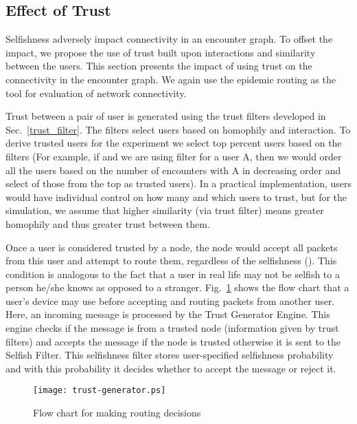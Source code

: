 \documentclass[10pt,conference]{IEEEtran}
\begin{document}
\subsection{Effect of Trust}


Selfishness adversely impact connectivity in an encounter graph. To offset the impact, we propose the use of trust built upon interactions and similarity between the users. This section presents the impact of using trust on the connectivity in the encounter graph. We again use the epidemic routing as the tool for evaluation of network connectivity. 

Trust between a pair of user is generated using the trust filters developed in Sec.~\ref{trust_filter}. The filters select users based on homophily and interaction. To derive trusted users for the experiment we select top  percent users based on the filters (For example, if  and we are using  filter for a user A, then we would order all the users based on the number of encounters with A in decreasing order and select  of those from the top as trusted users). In a practical implementation, users would have individual control on how many and which users to trust, but for the simulation, we assume that higher similarity (via trust filter) means greater homophily and thus greater trust between them. 


Once a user is considered trusted by a node, the node would accept all packets from this user and  attempt to route them, regardless of the selfishness (). This condition is analogous to the fact that a user in real life may not be selfish to a person he/she knows as opposed to a stranger. Fig.~\ref{fig:trust-gen} shows the flow chart that a user's device may use before accepting and routing packets from another user. Here, an incoming message is processed by the Trust Generator Engine. This engine checks if the message is from a trusted node (information given by trust filters) and accepts the message if the node is trusted otherwise it is sent to the Selfish Filter. This selfishness filter stores user-specified selfishness probability and with this probability it decides whether to accept the message or reject it. 


\begin{figure}
\centering

\texttt{[image: trust-generator.ps]} 

\caption{Flow chart for making routing decisions}

\label{fig:trust-gen}
\end{figure}
\end{document}

